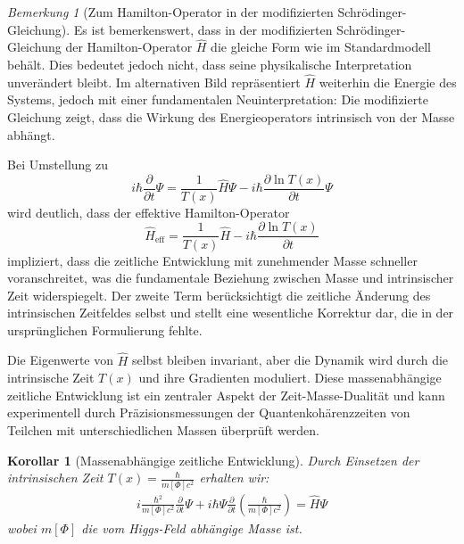 \documentclass{article}
\newtheorem{corollary}[theorem]{Korollar}
\theoremstyle{definition}
\theoremstyle{remark}
\newtheorem{remark}[theorem]{Bemerkung}
\newcommand{\Tfield}{T(x)} %
\begin{document}
		\begin{remark}[Zum Hamilton-Operator in der modifizierten Schrödinger-Gleichung]
			Es ist bemerkenswert, dass in der modifizierten Schrödinger-Gleichung der Hamilton-Operator $\hat{H}$ die gleiche Form wie im Standardmodell behält. Dies bedeutet jedoch nicht, dass seine physikalische Interpretation unverändert bleibt. Im alternativen Bild repräsentiert $\hat{H}$ weiterhin die Energie des Systems, jedoch mit einer fundamentalen Neuinterpretation: Die modifizierte Gleichung zeigt, dass die Wirkung des Energieoperators intrinsisch von der Masse abhängt. 
			
			Bei Umstellung zu 
			\begin{equation}
				i\hbar\frac{\partial}{\partial t}\Psi = \frac{1}{\Tfield}\hat{H}\Psi - i\hbar\frac{\partial \ln \Tfield}{\partial t}\Psi
			\end{equation}
			wird deutlich, dass der effektive Hamilton-Operator 
			\begin{equation}
				\hat{H}_{\text{eff}} = \frac{1}{\Tfield}\hat{H} - i\hbar\frac{\partial \ln \Tfield}{\partial t}
			\end{equation}
			impliziert, dass die zeitliche Entwicklung mit zunehmender Masse schneller voranschreitet, was die fundamentale Beziehung zwischen Masse und intrinsischer Zeit widerspiegelt. Der zweite Term berücksichtigt die zeitliche Änderung des intrinsischen Zeitfeldes selbst und stellt eine wesentliche Korrektur dar, die in der ursprünglichen Formulierung fehlte.
			
			Die Eigenwerte von $\hat{H}$ selbst bleiben invariant, aber die Dynamik wird durch die intrinsische Zeit $\Tfield$ und ihre Gradienten moduliert. Diese massenabhängige zeitliche Entwicklung ist ein zentraler Aspekt der Zeit-Masse-Dualität und kann experimentell durch Präzisionsmessungen der Quantenkohärenzzeiten von Teilchen mit unterschiedlichen Massen überprüft werden.
		\end{remark}
		
		\begin{corollary}[Massenabhängige zeitliche Entwicklung]
			Durch Einsetzen der intrinsischen Zeit $\Tfield = \frac{\hbar}{m[\Phi]c^2}$ erhalten wir:
			\begin{multline}
				i\frac{\hbar^2}{m[\Phi]c^2}\frac{\partial}{\partial t}\Psi + i\hbar\Psi\frac{\partial}{\partial t}\left(\frac{\hbar}{m[\Phi]c^2}\right) = \hat{H}\Psi
			\end{multline}
			wobei $m[\Phi]$ die vom Higgs-Feld abhängige Masse ist.
		\end{corollary}
		
\end{document}
